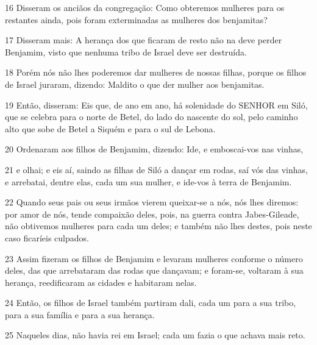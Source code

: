 \par 16 Disseram os anciãos da congregação: Como obteremos mulheres para os restantes ainda, pois foram exterminadas as mulheres dos benjamitas?
\par 17 Disseram mais: A herança dos que ficaram de resto não na deve perder Benjamim, visto que nenhuma tribo de Israel deve ser destruída.
\par 18 Porém nós não lhes poderemos dar mulheres de nossas filhas, porque os filhos de Israel juraram, dizendo: Maldito o que der mulher aos benjamitas.
\par 19 Então, disseram: Eis que, de ano em ano, há solenidade do SENHOR em Siló, que se celebra para o norte de Betel, do lado do nascente do sol, pelo caminho alto que sobe de Betel a Siquém e para o sul de Lebona.
\par 20 Ordenaram aos filhos de Benjamim, dizendo: Ide, e emboscai-vos nas vinhas,
\par 21 e olhai; e eis aí, saindo as filhas de Siló a dançar em rodas, saí vós das vinhas, e arrebatai, dentre elas, cada um sua mulher, e ide-vos à terra de Benjamim.
\par 22 Quando seus pais ou seus irmãos vierem queixar-se a nós, nós lhes diremos: por amor de nós, tende compaixão deles, pois, na guerra contra Jabes-Gileade, não obtivemos mulheres para cada um deles; e também não lhes destes, pois neste caso ficaríeis culpados.
\par 23 Assim fizeram os filhos de Benjamim e levaram mulheres conforme o número deles, das que arrebataram das rodas que dançavam; e foram-se, voltaram à sua herança, reedificaram as cidades e habitaram nelas.
\par 24 Então, os filhos de Israel também partiram dali, cada um para a sua tribo, para a sua família e para a sua herança.
\par 25 Naqueles dias, não havia rei em Israel; cada um fazia o que achava mais reto.



